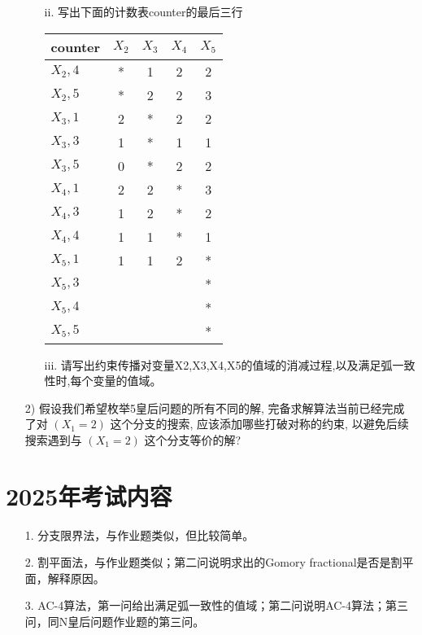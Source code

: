 \documentclass{article}
\begin{document}
\begin{enumerate}
\begin{enumerate}
    
        \item[ii.] 写出下面的计数表counter的最后三行
        
            \begin{center}
            \begin{longtable}{|l|c|c|c|c|}
            \hline
            counter & $X_2$ & $X_3$ & $X_4$ & $X_5$ \\ \hline
            \endfirsthead
            \hline
            \endhead
            \hline
            \endfoot
            \hline
            \endlastfoot
            $X_2,4$ & * & 1 & 2 & 2 \\ \hline
            $X_2,5$ & * & 2 & 2 & 3 \\ \hline
            $X_3,1$ & 2 & * & 2 & 2 \\ \hline
            $X_3,3$ & 1 & * & 1 & 1 \\ \hline
            $X_3,5$ & 0 & * & 2 & 2 \\ \hline
            $X_4,1$ & 2 & 2 & * & 3 \\ \hline
            $X_4,3$ & 1 & 2 & * & 2 \\ \hline
            $X_4,4$ & 1 & 1 & * & 1 \\ \hline
            $X_5,1$ & 1 & 1 & 2 & * \\ \hline
            $X_5,3$ &   &   &   & * \\ \hline
            $X_5,4$ &   &   &   & * \\ \hline
            $X_5,5$ &   &   &   & * \\ \hline
            \end{longtable}
            \end{center}

        \item[iii.] 请写出约束传播对变量X2,X3,X4,X5的值域的消减过程,以及满足弧一致性时,每个变量的值域。
    \end{enumerate}
    
    \item[2)] 假设我们希望枚举5皇后问题的所有不同的解, 完备求解算法当前已经完成了对 $(X_1=2)$ 这个分支的搜索, 应该添加哪些打破对称的约束, 以避免后续搜索遇到与 $(X_1=2)$ 这个分支等价的解?
\end{enumerate}
\newpage

\section*{2025年考试内容}
\begin{enumerate}
    \item[1. ]分支限界法，与作业题类似，但比较简单。
    \item[2. ]割平面法，与作业题类似；第二问说明求出的Gomory fractional是否是割平面，解释原因。
    \item[3. ]AC-4算法，第一问给出满足弧一致性的值域；第二问说明AC-4算法；第三问，同N皇后问题作业题的第三问。
\end{enumerate}
\end{document}
